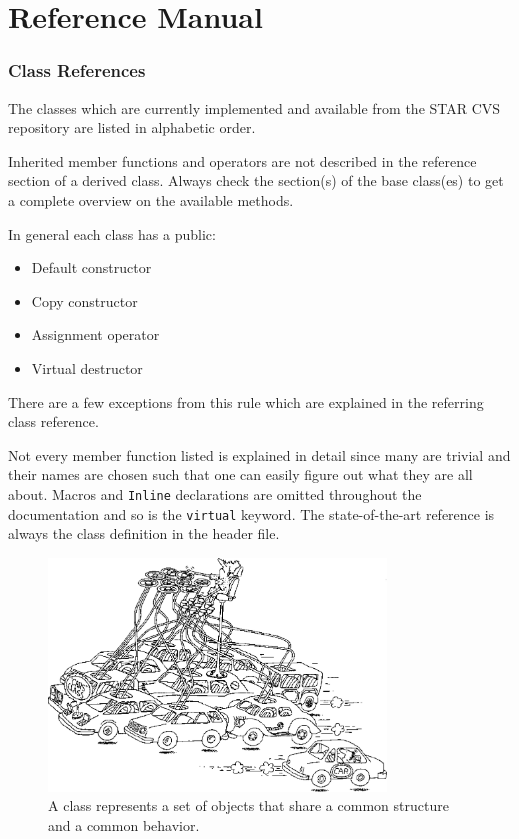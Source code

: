 \documentclass[twoside]{article}
\begin{document}
\clearpage

%
%
\part{Reference Manual}
\clearpage

\section{Class References} %
The classes which are currently implemented and available from the
STAR CVS repository are listed in alphabetic order.

Inherited member functions and operators are not described in the
reference section of a derived class. Always check the section(s) of
the base class(es) to get a complete overview on the available
methods.

In general each class has a public:
\begin{itemize}
\item Default constructor
\item Copy constructor
\item Assignment operator
\item Virtual destructor
\end{itemize}
There are a few exceptions from this rule which are explained in the
referring class reference.

Not every member function listed is explained in detail since many are
trivial and their names are chosen such that one can easily figure out
what they are all about.  Macros and \texttt{Inline} declarations are
omitted throughout the documentation and so is the \texttt{virtual}
keyword.  The state-of-the-art reference is always the class
definition in the header file.
\begin{figure}[htb]
    \begin{center}
        \includegraphics[width=0.8\textwidth]{cartoon8.eps}
        \caption{A class represents a set of objects that share
            a common structure and a common behavior.}
    \end{center}
\end{figure}
\clearpage
\end{document}
